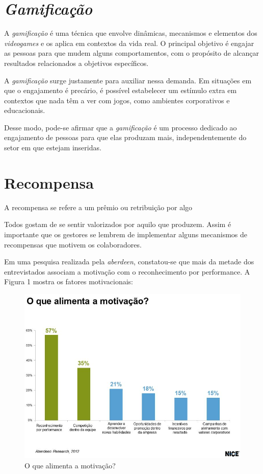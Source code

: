 \documentclass[
    12pt,               %
    openright,          %
    oneside,
    a4paper,            %
    paginasA3,  %
    english,            %
    brazil              %
    ]{ifsp-spo-inf-ctds} %
\begin{document}
\section{\textit{Gamificação}}
A \textit{gamificação} é uma técnica que envolve dinâmicas, mecanismos e elementos dos \textit{videogames} e os aplica em contextos da vida real. O principal objetivo é engajar as pessoas para que mudem alguns comportamentos, com o propósito de alcançar resultados relacionados a objetivos específicos.


A \textit{gamificação} surge justamente para auxiliar nessa demanda. Em situações em que o engajamento é precário, é possível estabelecer um estímulo extra em contextos que nada têm a ver com jogos, como ambientes corporativos e educacionais.
\cite{gamificacao-corporativa:2017}


Desse modo, pode-se afirmar que a \textit{gamificação} é um processo dedicado ao engajamento de pessoas para que elas produzam mais, independentemente do setor em que estejam inseridas.
\cite{gamificacao-corporativa:2017}


\section{Recompensa}
A recompensa se refere a um prêmio ou retribuição por algo \cite{dicio-recompensa:2009}


Todos gostam de se sentir valorizados por aquilo que produzem. Assim é importante que os gestores se lembrem de implementar alguns mecanismos de recompensas que motivem os colaboradores. \cite{gamificacao-corporativa:2017}


Em uma pesquisa realizada pela \textit{\gls{aberdeen}}, constatou-se que mais da metade dos entrevistados associam a motivação com o reconhecimento por performance. A Figura 1 mostra os fatores motivacionais:

\begin{figure}[htb]
    \centering
	\includegraphics[width=16cm]{imagens/recompensa.jpg}
	\caption{O que alimenta a motivação?}
\end{figure}
\FloatBarrier
\end{document}
